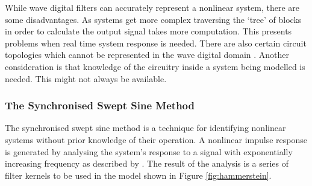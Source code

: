 			While wave digital filters can accurately represent a nonlinear system, there are some
			disadvantages. As systems get more complex traversing the `tree' of blocks in order to calculate
			the output signal takes more computation. This presents problems when real time system response is
			needed. There are also certain circuit topologies which cannot be represented in the wave digital
			domain \citep{valimaki2011virtual}. Another consideration is that knowledge of the circuitry inside
			a system being modelled is needed. This might not always be available.

		\subsubsection{The Synchronised Swept Sine Method}
			The synchronised swept sine method is a technique for identifying nonlinear systems without prior
			knowledge of their operation. A nonlinear impulse response is generated by analysing the system's
			response to a signal with exponentially increasing frequency as described by
			\citet{novak2010nonlinear}. The result of the analysis is a series of filter kernels to be used in
			the model shown in Figure \ref{fig:hammerstein}.

